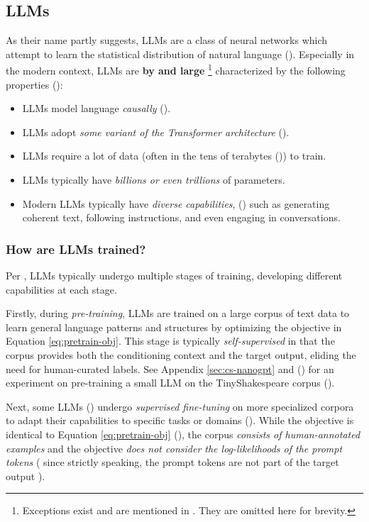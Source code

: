 \documentclass{article} %
\theoremstyle{definition}
\begin{document}
\subsection{LLMs}
As their name partly suggests, LLMs are a class of neural networks 
which attempt to learn the statistical distribution of natural language
(\cite{Zhao-et-al-2023, Karpathy-2025}). Especially in the modern context,
LLMs are \textbf{by and large} \footnote{Exceptions exist and are mentioned in \cite{wk5}. They are omitted here for brevity.} characterized by the following properties (\cite{wk5}):
\begin{itemize}
    \item LLMs model language \textit{causally} (\cite{Jurafsky-2024, Karpathy-2025}).
    \item LLMs adopt \textit{some variant of the Transformer architecture} (\cite{Vaswani-et-al-2017}).
    \item LLMs require a lot of data (often in the tens of terabytes (\cite{Karpathy-2025})) to train.
    \item LLMs typically have \textit{billions or even trillions} of parameters.
    \item Modern LLMs typically have \textit{diverse capabilities}, (\cite{Brown-et-al-2020})
        such as generating coherent text, following instructions, 
        and even engaging in conversations.
\end{itemize}

\subsubsection{How are LLMs trained?}
Per \cite{Karpathy-2025}, LLMs typically undergo multiple stages of training,
developing different capabilities at each stage.

Firstly, during \textit{pre-training}, LLMs are trained on a large corpus of text data
to learn general language patterns and structures by optimizing the objective in Equation \eqref{eq:pretrain-obj}.
This stage is typically \textit{self-supervised} in that the corpus
provides both the conditioning context and the target output, eliding
the need for human-curated labels. See Appendix \ref{sec:cs-nanogpt} and (\cite{wk8})
for an experiment on pre-training a small LLM on the TinyShakespeare corpus (\cite{tinyss, tinyss2}).

Next, some LLMs (\cite{InstructGPT-2022}) undergo \textit{supervised fine-tuning} on more specialized corpora to adapt 
their capabilities to specific tasks or domains (\cite{radford-et-al-2019,Brown-et-al-2020}).
While the objective is identical to Equation \eqref{eq:pretrain-obj} (\cite{wk5}),
the corpus \textit{consists of human-annotated examples} and 
the objective \textit{does not consider the log-likelihoods of the prompt tokens} (
    since strictly speaking, the prompt tokens are not part of the target output
).
\end{document}
